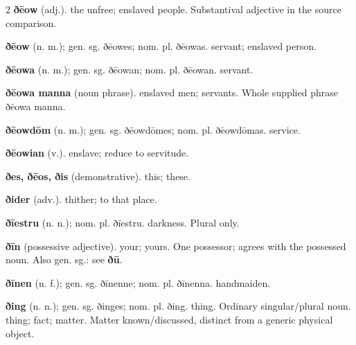 \begin{multicols*}{2}
\textbf{ðēow} (adj.). the unfree; enslaved people. Substantival adjective in the source comparison.\par
\textbf{ðēow} (n. m.); gen. sg. ðēowes; nom. pl. ðēowas. servant; enslaved person.\par
\textbf{ðēowa} (n. m.); gen. sg. ðēowan; nom. pl. ðēowan. servant.\par
\textbf{ðēowa manna} (noun phrase). enslaved men; servants. Whole supplied phrase ðēowa manna.\par
\textbf{ðēowdōm} (n. m.); gen. sg. ðēowdōmes; nom. pl. ðēowdōmas. service.\par
\textbf{ðēowian} (v.). enslave; reduce to servitude.\par
\textbf{ðes, ðēos, ðis} (demonstrative). this; these.\par
\textbf{ðider} (adv.). thither; to that place.\par
\textbf{ðīestru} (n. n.); nom. pl. ðīestru. darkness. Plural only.\par
\textbf{ðīn} (possessive adjective). your; yours. One possessor; agrees with the possessed noun. Also gen. sg.: see \textbf{ðū}.\par
\textbf{ðīnen} (n. f.); gen. sg. ðīnenne; nom. pl. ðīnenna. handmaiden.\par
\textbf{ðing} (n. n.); gen. sg. ðinges; nom. pl. ðing. thing. Ordinary singular/plural noun. thing; fact; matter. Matter known/discussed, distinct from a generic physical object.\par

\end{multicols*}
